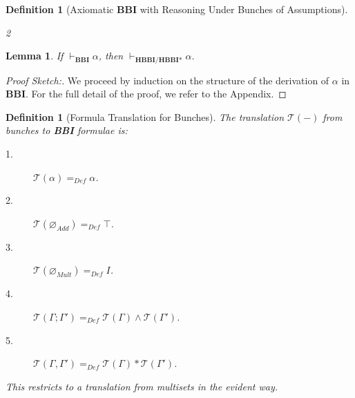 \documentclass[a4paper]{article}
\newtheorem{lemma}[theorem]{Lemma}
\newtheorem{definition}[theorem]{Definition}
\newcommand\magicwand{\mathrel{-\mkern-6mu*}}
\newcommand{\BBI}{\textbf{BBI}\xspace}
\begin{document}
\begin{definition}[Axiomatic \BBI with Reasoning Under Bunches of Assumptions]
\begin{enumerate}
\begin{multicols}{2}
\vspace{0.5em}
\item \AxiomC{$\Gamma \vdash (\alpha *\beta) \rightarrow \gamma$}
\UnaryInfC{$\Gamma \vdash \alpha \rightarrow (\beta \magicwand \gamma)$}

\DisplayProof

\vspace{0.5em}
\item \AxiomC{$\Gamma \vdash \alpha $}
\AxiomC{$\Delta \vdash \beta$}

\BinaryInfC{$\Gamma, \Delta \vdash \alpha*\beta$}
\DisplayProof


\end{multicols}

\end{enumerate}

    
\end{definition}

\begin{lemma}\label{lemma_HBBI_a} If $\vdash_{\BBI}\alpha$, then $\vdash_{\textbf{HBBI}/\textbf{HBBI*}} \alpha$.
    
\end{lemma}

\begin{proof}[Proof Sketch:] We proceed by induction on the structure of the derivation of $\alpha$ in \BBI. For the full detail of the proof, we refer to the Appendix.    
\end{proof}




\begin{definition}[Formula Translation for Bunches]\label{Formula_Translation}
The translation $\mathcal{T}(-)$ from bunches to \BBI formulae is:
\begin{description}
    \item[1.] $\mathcal{T}(\alpha) =_{Def} \alpha $.
    \item[2.] $\mathcal{T}(\varnothing_{Add}) =_{Def} \top $.
    \item[3.] $\mathcal{T}(\varnothing_{Mult}) =_{Def} I $.
    \item[4.] $\mathcal{T}(\Gamma;\Gamma') =_{Def} \mathcal{T}(\Gamma)\land\mathcal{T}(\Gamma') $.
    \item[5.] $\mathcal{T}(\Gamma,\Gamma') =_{Def} \mathcal{T}(\Gamma)*\mathcal{T}(\Gamma') $.
\end{description}
This restricts to a translation from multisets in the evident way.
\end{definition}
\end{document}
